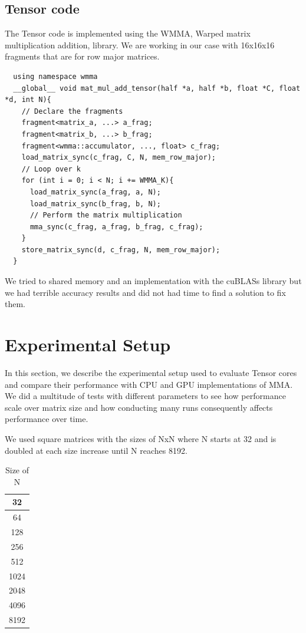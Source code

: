 \documentclass[conference]{IEEEtran}
\begin{document}
  
  \subsection{Tensor code}\label{sec:TensorCode}
  The Tensor code is implemented using the WMMA,  Warped matrix multiplication addition,
  library. We are working in our case with 16x16x16 fragments that are for row major matrices.
  \begin{lstlisting}
  using namespace wmma
  __global__ void mat_mul_add_tensor(half *a, half *b, float *C, float *d, int N){
    // Declare the fragments
    fragment<matrix_a, ...> a_frag;
    fragment<matrix_b, ...> b_frag;
    fragment<wmma::accumulator, ..., float> c_frag;
    load_matrix_sync(c_frag, C, N, mem_row_major);
    // Loop over k
    for (int i = 0; i < N; i += WMMA_K){
      load_matrix_sync(a_frag, a, N);
      load_matrix_sync(b_frag, b, N);
      // Perform the matrix multiplication
      mma_sync(c_frag, a_frag, b_frag, c_frag);
    }
    store_matrix_sync(d, c_frag, N, mem_row_major);
  }
  \end{lstlisting}

  We tried to shared memory and an implementation with the cuBLASs library but we had terrible 
  accuracy results and did not had time to find a solution to fix them. 

  \section{Experimental Setup}\label{sec:experimental-setup}
  
  In this section, we describe the experimental setup used to evaluate 
  Tensor cores and compare their performance with CPU and GPU implementations of MMA.
  We did a multitude of tests with different parameters to see how performance scale over matrix size
  and how conducting many runs consequently affects performance over time.

  We used square matrices with the sizes of NxN where N starts at 32 and is doubled at each size increase until N reaches 8192.

  \begin{table}[h]
    \caption{Size of N}
  \centering
    \begin{tabular}{|c|}
    \hline
    32 \\
    \hline
    64 \\
    \hline
    128 \\
    \hline
    256 \\
    \hline
    512 \\
    \hline
    1024 \\
    \hline
    2048 \\
    \hline
    4096 \\
    \hline
    8192 \\
    \hline

    \end{tabular}
  \end{table}
\end{document}
